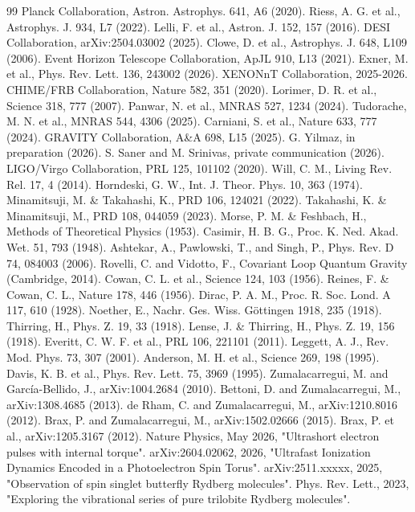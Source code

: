 \documentclass[11pt,a4paper]{article}
\begin{document}
\begin{thebibliography}{99}
 Planck Collaboration, Astron. Astrophys. 641, A6 (2020).
 Riess, A. G. et al., Astrophys. J. 934, L7 (2022).
 Lelli, F. et al., Astron. J. 152, 157 (2016).
 DESI Collaboration, arXiv:2504.03002 (2025).
 Clowe, D. et al., Astrophys. J. 648, L109 (2006).
 Event Horizon Telescope Collaboration, ApJL 910, L13 (2021).
 Exner, M. et al., Phys. Rev. Lett. 136, 243002 (2026).
 XENONnT Collaboration, 2025-2026.
 CHIME/FRB Collaboration, Nature 582, 351 (2020).
 Lorimer, D. R. et al., Science 318, 777 (2007).
 Panwar, N. et al., MNRAS 527, 1234 (2024).
 Tudorache, M. N. et al., MNRAS 544, 4306 (2025).
 Carniani, S. et al., Nature 633, 777 (2024).
 GRAVITY Collaboration, A\&A 698, L15 (2025).
 G. Yilmaz, in preparation (2026).
 S. Saner and M. Srinivas, private communication (2026).
 LIGO/Virgo Collaboration, PRL 125, 101102 (2020).
 Will, C. M., Living Rev. Rel. 17, 4 (2014).
 Horndeski, G. W., Int. J. Theor. Phys. 10, 363 (1974).
 Minamitsuji, M. \& Takahashi, K., PRD 106, 124021 (2022).
 Takahashi, K. \& Minamitsuji, M., PRD 108, 044059 (2023).
 Morse, P. M. \& Feshbach, H., Methods of Theoretical Physics (1953).
 Casimir, H. B. G., Proc. K. Ned. Akad. Wet. 51, 793 (1948).
 Ashtekar, A., Pawlowski, T., and Singh, P., Phys. Rev. D 74, 084003 (2006).
 Rovelli, C. and Vidotto, F., Covariant Loop Quantum Gravity (Cambridge, 2014).
 Cowan, C. L. et al., Science 124, 103 (1956).
 Reines, F. \& Cowan, C. L., Nature 178, 446 (1956).
 Dirac, P. A. M., Proc. R. Soc. Lond. A 117, 610 (1928).
 Noether, E., Nachr. Ges. Wiss. Göttingen 1918, 235 (1918).
 Thirring, H., Phys. Z. 19, 33 (1918).
 Lense, J. \& Thirring, H., Phys. Z. 19, 156 (1918).
 Everitt, C. W. F. et al., PRL 106, 221101 (2011).
 Leggett, A. J., Rev. Mod. Phys. 73, 307 (2001).
 Anderson, M. H. et al., Science 269, 198 (1995).
 Davis, K. B. et al., Phys. Rev. Lett. 75, 3969 (1995).
 Zumalacarregui, M. and García-Bellido, J., arXiv:1004.2684 (2010).
 Bettoni, D. and Zumalacarregui, M., arXiv:1308.4685 (2013).
 de Rham, C. and Zumalacarregui, M., arXiv:1210.8016 (2012).
 Brax, P. and Zumalacarregui, M., arXiv:1502.02666 (2015).
 Brax, P. et al., arXiv:1205.3167 (2012).
 Nature Physics, May 2026, "Ultrashort electron pulses with internal torque".
 arXiv:2604.02062, 2026, "Ultrafast Ionization Dynamics Encoded in a Photoelectron Spin Torus".
 arXiv:2511.xxxxx, 2025, "Observation of spin singlet butterfly Rydberg molecules".
 Phys. Rev. Lett., 2023, "Exploring the vibrational series of pure trilobite Rydberg molecules".
\end{thebibliography}
\end{document}
